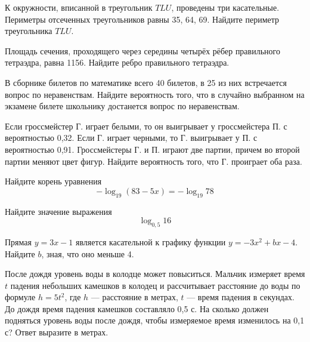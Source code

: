 \documentclass[twocolumn]{article}
\begin{document}
\cleardoublepage
\def\examvart{Вариант 17.1}
\normalsize

\startpartone
\large




\begin{taskBN}{1}
К окружности, вписанной в треугольник $TLU$, проведены три касательные. Периметры отсеченных треугольников равны 35, 64, 69. Найдите периметр треугольника $TLU$.
\end{taskBN}

\begin{taskBN}{2}
Площадь сечения, проходящего через середины четырёх рёбер правильного тетраэдра, равна 1156. Найдите ребро правильного тетраэдра.
\end{taskBN}

\begin{taskBN}{3}
В сборнике билетов по математике всего 40 билетов, в 25 из них встречается вопрос по неравенствам. Найдите вероятность того, что в случайно выбранном на экзамене билете школьнику достанется вопрос по неравенствам.
\end{taskBN}

\begin{taskBN}{4}
Если гроссмейстер Г. играет белыми, то он выигрывает у гроссмейстера П. с вероятностью 0,32. Если Г. играет черными, то Г. выигрывает у П. с вероятностью 0,91. Гроссмейстеры Г. и П. играют две партии, причем во второй партии меняют цвет фигур. Найдите вероятность того, что Г. проиграет оба раза.
\end{taskBN}

\begin{taskBN}{5}
Найдите корень уравнения $$-\log_{19}(83-5x)=-\log_{19}78$$
\end{taskBN}

\begin{taskBN}{6}
Найдите значение выражения $$ \log_{0,5}16 $$
\end{taskBN}

\begin{taskBN}{7}
Прямая $y=3x-1$ является касательной к графику функции $y=-3x^{2}+bx-4$. Найдите $b$, зная, что оно меньше 4.
\end{taskBN}

\begin{taskBN}{8}
После дождя уровень воды в колодце может повыситься. Мальчик измеряет время $t$ падения небольших камешков в колодец и рассчитывает расстояние до воды по формуле  $h=5t^2$, где $h$ — расстояние в метрах, $t$ — время падения в секундах. До дождя время падения камешков составляло 0,5 с. На сколько должен подняться уровень воды после дождя, чтобы измеряемое время изменилось на 0,1 с? Ответ выразите в метрах.
\end{taskBN}
\end{document}
